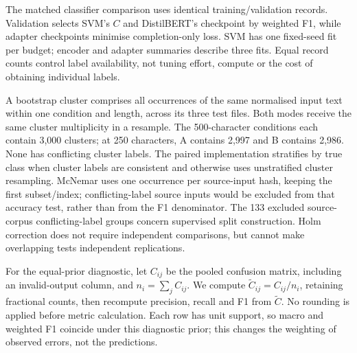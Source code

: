 \documentclass[11pt]{article}
\begin{document}
The matched classifier comparison uses identical training/validation
records. Validation selects SVM's $C$ and DistilBERT's checkpoint by
weighted F1, while adapter checkpoints minimise completion-only loss.
SVM has one fixed-seed fit per budget; encoder and adapter summaries
describe three fits. Equal record counts control label availability,
not tuning effort, compute or the cost of obtaining individual labels.

A bootstrap cluster comprises all occurrences of the same normalised
input text within one condition and length, across its three test files.
Both modes receive the same cluster multiplicity in a resample. The
500-character conditions each contain 3,000 clusters; at 250 characters,
A contains 2,997 and B contains 2,986. None has conflicting cluster labels.
The paired implementation stratifies by true class when cluster labels
are consistent and otherwise uses unstratified cluster resampling.
McNemar uses one occurrence per source-input hash, keeping the first
subset/index; conflicting-label source inputs would be excluded from
that accuracy test, rather than from the F1 denominator. The 133 excluded
source-corpus conflicting-label groups concern supervised split
construction. Holm correction does not require independent comparisons,
but cannot make overlapping tests independent replications.

For the equal-prior diagnostic, let $C_{ij}$ be the pooled confusion
matrix, including an invalid-output column, and $n_i=\sum_j C_{ij}$.
We compute $\widetilde C_{ij}=C_{ij}/n_i$, retaining fractional counts,
then recompute precision, recall and F1 from $\widetilde C$.
No rounding is applied before metric calculation. Each row has unit
support, so macro and weighted F1 coincide under this diagnostic prior;
this changes the weighting of observed errors, not the predictions.
\end{document}
